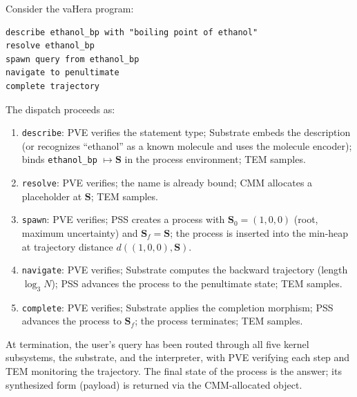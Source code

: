\documentclass[11pt,twocolumn,a4paper]{article}
\newcommand{\Scoord}{\mathbf{S}}
\begin{document}
Consider the vaHera program:
\begin{center}
\begin{minipage}{0.9\columnwidth}
\begin{lstlisting}[style=vaheralst]
describe ethanol_bp with "boiling point of ethanol"
resolve ethanol_bp
spawn query from ethanol_bp
navigate to penultimate
complete trajectory
\end{lstlisting}
\end{minipage}
\end{center}

The dispatch proceeds as:

\begin{enumerate}[leftmargin=*]
\item \texttt{describe}: PVE verifies the statement type; Substrate embeds the description (or recognizes ``ethanol'' as a known molecule and uses the molecule encoder); binds \texttt{ethanol\_bp} $\mapsto \Scoord$ in the process environment; TEM samples.
\item \texttt{resolve}: PVE verifies; the name is already bound; CMM allocates a placeholder at $\Scoord$; TEM samples.
\item \texttt{spawn}: PVE verifies; PSS creates a process with $\Scoord_0 = (1,0,0)$ (root, maximum uncertainty) and $\Scoord_f = \Scoord$; the process is inserted into the min-heap at trajectory distance $d((1,0,0), \Scoord)$.
\item \texttt{navigate}: PVE verifies; Substrate computes the backward trajectory (length $\log_3 N$); PSS advances the process to the penultimate state; TEM samples.
\item \texttt{complete}: PVE verifies; Substrate applies the completion morphism; PSS advances the process to $\Scoord_f$; the process terminates; TEM samples.
\end{enumerate}

At termination, the user's query has been routed through all five kernel subsystems, the substrate, and the interpreter, with PVE verifying each step and TEM monitoring the trajectory. The final state of the process is the answer; its synthesized form (payload) is returned via the CMM-allocated object.
\end{document}
